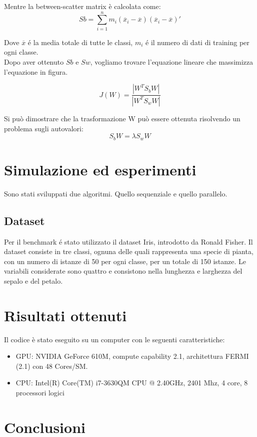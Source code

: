 \documentclass[twocolumn]{article}
\begin{document}
Mentre la between-scatter matrix è calcolata come:
\[Sb = \sum_{i=1}^{n}m_{i}(\overline{x}_{i}-\overline{x})(\overline{x}_{i}-\overline{x})'\]

Dove \(\overline{x}\) \'e la media totale di tutte le classi, \(m_{i}\) \'e il numero di dati di training per ogni classe.\\
Dopo aver ottenuto \(Sb\) e \(Sw\), vogliamo trovare l'equazione lineare che massimizza l'equazione in figura.

\[J(W) = \frac{|W^{T} S_{b}  W|}{|W^{T} S_{w} W|}\]

Si può dimostrare che la trasformazione W può essere ottenuta risolvendo un problema sugli autovalori:
\[S_{b}W = \lambda S_{w}W\]
 
\section{Simulazione ed esperimenti}
Sono stati sviluppati due algoritmi. Quello sequenziale e quello parallelo.
\subsection{Dataset}
Per il benchmark \'e stato utilizzato il dataset Iris, introdotto da Ronald Fisher. Il dataset consiste in tre classi, ognuna delle quali rappresenta una specie di pianta, con un numero di istanze di 50 per ogni classe, per un totale di 150 istanze.
Le variabili considerate sono quattro e consistono nella lunghezza e larghezza del sepalo e del petalo.
\section{Risultati ottenuti}
Il codice è stato eseguito su un computer con le seguenti caratteristiche:
\begin{itemize}
	\item GPU: NVIDIA GeForce 610M, compute capability  2.1, architettura FERMI (2.1) con 48 Cores/SM.
	\item CPU: Intel(R) Core(TM) i7-3630QM CPU @ 2.40GHz, 2401 Mhz, 4 core, 8 processori logici
\end{itemize}
 



\section{Conclusioni}
\lipsum[1-2]
\end{document}
